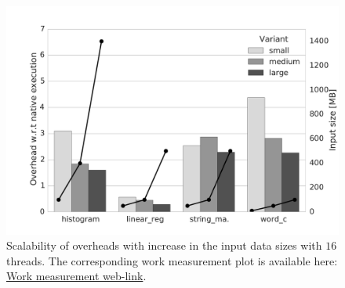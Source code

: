 
\begin{figure}[t]
\centering
\includegraphics[scale=0.22]{figure/benchmarks/worksize-times-Total_overheads.pdf}
\caption{Scalability of overheads with increase in the input data sizes with $16$ threads. The corresponding work measurement plot is available here: \href{https://mic92.github.io/inspector/index.html\#graph6}{Work measurement web-link}.}
\label{fig:data-size-overheads}
\end{figure}
